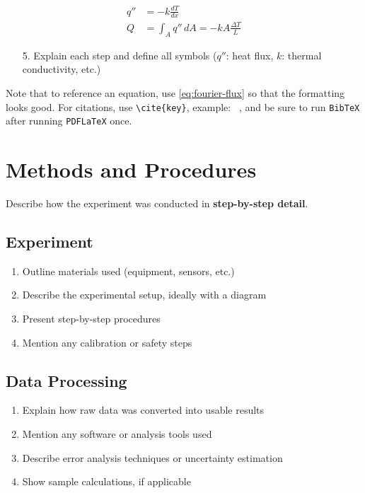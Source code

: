 \documentclass{413L}
\begin{document}
\begin{equation}
\label{eq:fourier-flux}
\begin{split}
    q'' &= -k \frac{dT}{dx} \\
    Q &= \int_A q'' \, dA = -k A \frac{\Delta T}{L}
\end{split}
\end{equation}

\begin{enumerate}
    \item[5.] Explain each step and define all symbols (\(q''\): heat flux, \(k\): thermal conductivity, etc.)
\end{enumerate}

Note that to reference an equation, use \cref{eq:fourier-flux} so that the formatting looks good.
For citations, use \verb|\cite{key}|, example: ~\cite{EXAMPLE}, and be sure to run \texttt{BibTeX} after running \texttt{PDFLaTeX} once.

\section{Methods and Procedures}
Describe how the experiment was conducted in \textbf{step-by-step detail}.

\subsection{Experiment}
\begin{enumerate}
    \item Outline materials used (equipment, sensors, etc.)
    \item Describe the experimental setup, ideally with a diagram
    \item Present step-by-step procedures
    \item Mention any calibration or safety steps
\end{enumerate}

\subsection{Data Processing}
\begin{enumerate}
    \item Explain how raw data was converted into usable results
    \item Mention any software or analysis tools used
    \item Describe error analysis techniques or uncertainty estimation
    \item Show sample calculations, if applicable
\end{enumerate}
\end{document}
